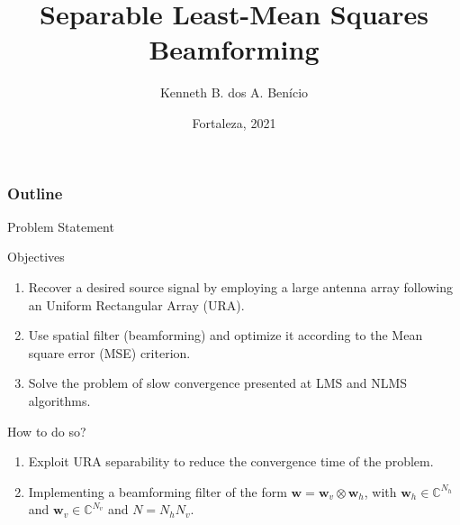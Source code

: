 \documentclass[10pt]{beamer}
\title[Short Title]{%
    Separable Least-Mean Squares Beamforming 
    \vspace{0.5cm}
}
\author{Kenneth B. dos A. Benício}
\institute{
        \textit{Department of Teleinformatics Engineering}\\
        \textit{Federal University of Ceará}
        \vspace{0.5cm}
}
\date[Fortaleza, 2021]{%
    Fortaleza, 2021
}
\begin{document}
{
    \maketitle
}


 \begin{frame}
 \frametitle{Outline}
 \tableofcontents
 \end{frame}


\begin{frame}{Problem Statement}
    \begin{block}{Objectives}
        \begin{enumerate}
            \item Recover a desired source signal by employing a large antenna array following an Uniform Rectangular Array (URA).
            \item Use spatial filter (beamforming) and optimize it according to the Mean square error (MSE) criterion.
            \item Solve the problem of slow convergence presented at LMS and NLMS algorithms.
        \end{enumerate}
    \end{block}
    \begin{block}{How to do so?}
        \begin{enumerate}
            \item Exploit URA separability to reduce the convergence time of the problem.
            \item Implementing a beamforming filter of the form $\mathbf{w} = \mathbf{w}_{v} \otimes \mathbf{w}_{h}$, with $\mathbf{w}_{h} \in \mathbb{C}^{N_{h}}$ and $\mathbf{w}_{v} \in \mathbb{C}^{N_{v}}$ and $N = N_{h} N_{v}$.
        \end{enumerate}
    \end{block}    
\end{frame}

\end{document}
